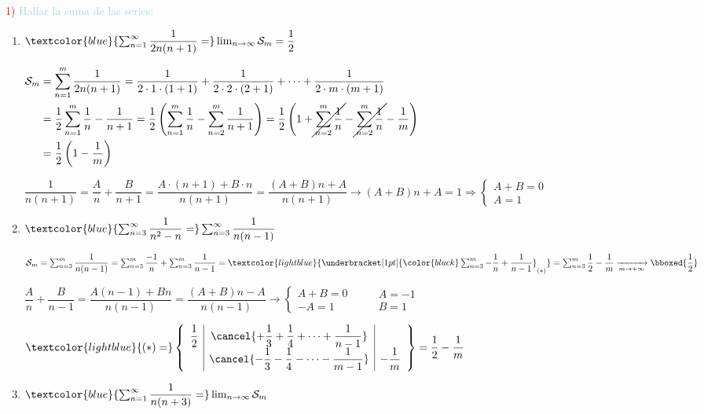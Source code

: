 

\textcolor{red}{1) }\textcolor{lightblue}{Hallar la suma de las series:}

\begin{enumerate}[label=\color{red}\alph*)]
	\item $\textcolor{blue}{\sum_{n=1}^{\infty}\dfrac{1}{2n(n+1)}=}\lim_{n\to\infty}\mathcal{S}_m=\dfrac{1}{2}$
	
	$\begin{aligned}
		\mathcal{S}_m&=\sum_{n=1}^{m}\dfrac{1}{2n(n+1)}=\dfrac{1}{2\cdot1\cdot(1+1)}+\dfrac{1}{2\cdot2\cdot(2+1)}+\cdots+\dfrac{1}{2\cdot m\cdot(m+1)}\\
		&=\dfrac{1}{2}\sum_{n=1}^{m}\dfrac{1}{n}-\dfrac{1}{n+1}=\dfrac{1}{2}\left(\sum_{n=1}^{m}\dfrac{1}{n}-\sum_{n=2}^{m}\dfrac{1}{n+1}\right)=\dfrac{1}{2}\left(1+\cancel{\sum_{n=2}^{m}\dfrac{1}{n}}-\cancel{\sum_{n=2}^{m}\dfrac{1}{n}}-\dfrac{1}{m}\right)\\
		&=\dfrac{1}{2}\left(1-\dfrac{1}{m}\right)
	\end{aligned}$
	
	$\dfrac{1}{n(n+1)}=\dfrac{A}{n}+\dfrac{B}{n+1}=\dfrac{A\cdot(n+1)+B\cdot n}{n(n+1)}=\dfrac{(A+B)n+A}{n(n+1)}\longrightarrow (A+B)n+A=1\Rightarrow\left\{\begin{array}{l}
		A+B=0\\
		A=1
	\end{array}\right.$
	\item $\textcolor{blue}{\sum_{n=3}^{\infty}\dfrac{1}{n^2-n}=}\sum_{n=3}^{\infty}\dfrac{1}{n(n-1)}$
	
	$\mathcal{S}_m=\sum_{n=3}^{m}\dfrac{1}{n(n-1)}=\sum_{n=3}^{m}\dfrac{-1}{n}+\sum_{n=3}^{m}\dfrac{1}{n-1}=\textcolor{lightblue}{\underbracket[1pt]{\color{black}\sum_{n=3}^{m}-\dfrac{1}{n}+\dfrac{1}{n-1}}_{(\ast)}}=\sum_{n=3}^{m}\dfrac{1}{2}-\dfrac{1}{m}\xrightarrow[m\to+\infty]{}\bboxed{\dfrac{1}{2}}$
	
	$\dfrac{A}{n}+\dfrac{B}{n-1}=\dfrac{A(n-1)+Bn}{n(n-1)}=\dfrac{(A+B)n-A}{n(n-1)}\longrightarrow\left\{\begin{array}{l}
		A+B=0\\
		-A=1
	\end{array}\right.\qquad\boxed{\begin{array}{l}
		A=-1\\
		B=1
		\end{array}}$
	
	$\textcolor{lightblue}{(\ast)=}\left\{\begin{array}{r|c|l}
		\dfrac{1}{2} & \cancel{+\dfrac{1}{3}+\dfrac{1}{4}+\cdots+\dfrac{1}{n-1}} & \\
		 & \cancel{-\dfrac{1}{3}-\dfrac{1}{4}-\cdots-\dfrac{1}{m-1} }& -\dfrac{1}{m}
	\end{array}\right\}=\dfrac{1}{2}-\dfrac{1}{m}$
	\item $\textcolor{blue}{\sum_{n=1}^{\infty}\dfrac{1}{n(n+3)}=}\lim_{n\to\infty}\mathcal{S}_m$
	

\end{enumerate}
